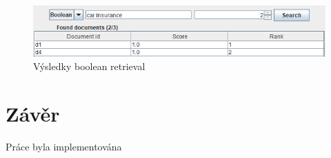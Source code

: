 \documentclass[11pt,a4paper]{scrartcl}
\begin{document}
	\begin{figure}[h]
		\centering
		\includegraphics[width=\linewidth]{gui-boolean-res}
		\caption{Výsledky boolean retrieval}
		\label{fig:boolean}
	\end{figure}
	
	\section{Závěr}
	
	Práce byla implementována
	
\end{document}
